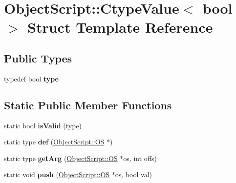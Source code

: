 \hypertarget{struct_object_script_1_1_ctype_value_3_01bool_01_4}{}\section{Object\+Script\+:\+:Ctype\+Value$<$ bool $>$ Struct Template Reference}
\label{struct_object_script_1_1_ctype_value_3_01bool_01_4}
\subsection*{Public Types}
\begin{DoxyCompactItemize}
\item 
typedef bool {\bfseries type}\hypertarget{struct_object_script_1_1_ctype_value_3_01bool_01_4_abe45d73d348385c30274ae9aedbcc358}{}\label{struct_object_script_1_1_ctype_value_3_01bool_01_4_abe45d73d348385c30274ae9aedbcc358}

\end{DoxyCompactItemize}
\subsection*{Static Public Member Functions}
\begin{DoxyCompactItemize}
\item 
static bool {\bfseries is\+Valid} (type)\hypertarget{struct_object_script_1_1_ctype_value_3_01bool_01_4_a32b2210ec909aebd944aba818f2cb313}{}\label{struct_object_script_1_1_ctype_value_3_01bool_01_4_a32b2210ec909aebd944aba818f2cb313}

\item 
static type {\bfseries def} (\hyperlink{class_object_script_1_1_o_s}{Object\+Script\+::\+OS} $\ast$)\hypertarget{struct_object_script_1_1_ctype_value_3_01bool_01_4_a2d11cefcd93bb4055bc5ea34bdeb8724}{}\label{struct_object_script_1_1_ctype_value_3_01bool_01_4_a2d11cefcd93bb4055bc5ea34bdeb8724}

\item 
static type {\bfseries get\+Arg} (\hyperlink{class_object_script_1_1_o_s}{Object\+Script\+::\+OS} $\ast$os, int offs)\hypertarget{struct_object_script_1_1_ctype_value_3_01bool_01_4_ab6e8ad01053e2a187d242c69c3e2ec8c}{}\label{struct_object_script_1_1_ctype_value_3_01bool_01_4_ab6e8ad01053e2a187d242c69c3e2ec8c}

\item 
static void {\bfseries push} (\hyperlink{class_object_script_1_1_o_s}{Object\+Script\+::\+OS} $\ast$os, bool val)\hypertarget{struct_object_script_1_1_ctype_value_3_01bool_01_4_ac0d129d18067b76fcfcde282a9176ed5}{}\label{struct_object_script_1_1_ctype_value_3_01bool_01_4_ac0d129d18067b76fcfcde282a9176ed5}

\end{DoxyCompactItemize}


